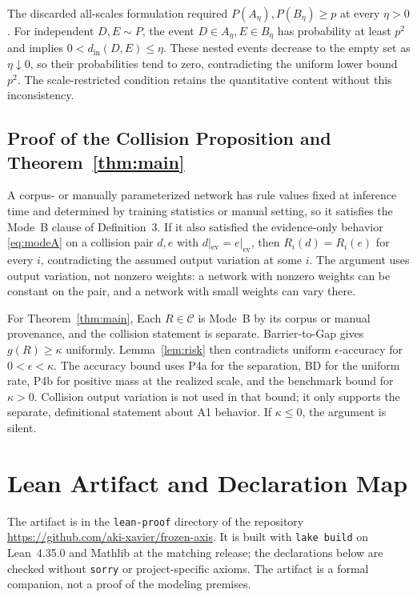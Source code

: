 \documentclass[twoside,11pt]{article}
\newcommand{\ev}{\mathrm{ev}}
\begin{document}
The discarded all-scales formulation required $P(A_\eta),P(B_\eta)\ge p$ at every $\eta>0$. For independent $D,E\sim P$, the event $D\in A_\eta,E\in B_\eta$ has probability at least $p^2$ and implies $0<d_{\mathrm{in}}(D,E)\le\eta$. These nested events decrease to the empty set as $\eta\downarrow0$, so their probabilities tend to zero, contradicting the uniform lower bound $p^2$. The scale-restricted condition retains the quantitative content without this inconsistency.

\subsection{Proof of the Collision Proposition and Theorem~\ref{thm:main}}
A corpus- or manually parameterized network has rule values fixed at inference time and determined by training statistics or manual setting, so it satisfies the Mode~B clause of Definition~3. If it also satisfied the evidence-only behavior \eqref{eq:modeA} on a collision pair $d,e$ with $d|_{\ev}=e|_{\ev}$, then $R_i(d)=R_i(e)$ for every $i$, contradicting the assumed output variation at some $i$. The argument uses output variation, not nonzero weights: a network with nonzero weights can be constant on the pair, and a network with small weights can vary there.

For Theorem~\ref{thm:main}, Each $R\in\mathcal{C}$ is Mode~B by its corpus or manual provenance, and the collision statement is separate. Barrier-to-Gap gives $g(R)\ge\kappa$ uniformly. Lemma~\ref{lem:risk} then contradicts uniform $\epsilon$-accuracy for $0<\epsilon<\kappa$. The accuracy bound uses P4a for the separation, BD for the uniform rate, P4b for positive mass at the realized scale, and the benchmark bound for $\kappa>0$. Collision output variation is not used in that bound; it only supports the separate, definitional statement about A1 behavior. If $\kappa\le0$, the argument is silent.

\section{Lean Artifact and Declaration Map}
\label{app:verification}

The artifact is in the \texttt{lean-proof} directory of the repository \url{https://github.com/aki-xavier/frozen-axis}. It is built with \texttt{lake build} on Lean~4.35.0 and Mathlib at the matching release; the declarations below are checked without \texttt{sorry} or project-specific axioms. The artifact is a formal companion, not a proof of the modeling premises.
\end{document}

